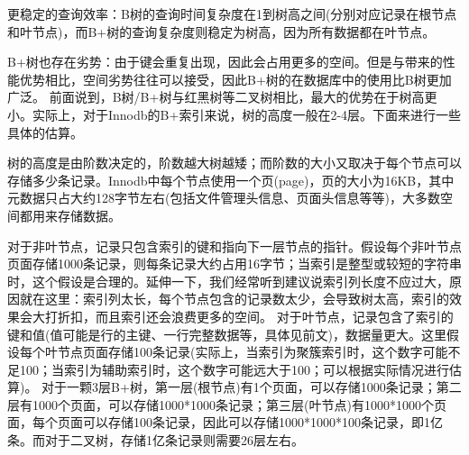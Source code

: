 \documentclass[../../../interview-questions.tex]{subfiles}
\begin{document}
更稳定的查询效率：B树的查询时间复杂度在1到树高之间(分别对应记录在根节点和叶节点)，而B+树的查询复杂度则稳定为树高，因为所有数据都在叶节点。

B+树也存在劣势：由于键会重复出现，因此会占用更多的空间。但是与带来的性能优势相比，空间劣势往往可以接受，因此B+树的在数据库中的使用比B树更加广泛。
前面说到，B树/B+树与红黑树等二叉树相比，最大的优势在于树高更小。实际上，对于Innodb的B+索引来说，树的高度一般在2-4层。下面来进行一些具体的估算。

树的高度是由阶数决定的，阶数越大树越矮；而阶数的大小又取决于每个节点可以存储多少条记录。Innodb中每个节点使用一个页(page)，页的大小为16KB，其中元数据只占大约128字节左右(包括文件管理头信息、页面头信息等等)，大多数空间都用来存储数据。

对于非叶节点，记录只包含索引的键和指向下一层节点的指针。假设每个非叶节点页面存储1000条记录，则每条记录大约占用16字节；当索引是整型或较短的字符串时，这个假设是合理的。延伸一下，我们经常听到建议说索引列长度不应过大，原因就在这里：索引列太长，每个节点包含的记录数太少，会导致树太高，索引的效果会大打折扣，而且索引还会浪费更多的空间。
对于叶节点，记录包含了索引的键和值(值可能是行的主键、一行完整数据等，具体见前文)，数据量更大。这里假设每个叶节点页面存储100条记录(实际上，当索引为聚簇索引时，这个数字可能不足100；当索引为辅助索引时，这个数字可能远大于100；可以根据实际情况进行估算)。
对于一颗3层B+树，第一层(根节点)有1个页面，可以存储1000条记录；第二层有1000个页面，可以存储1000*1000条记录；第三层(叶节点)有1000*1000个页面，每个页面可以存储100条记录，因此可以存储1000*1000*100条记录，即1亿条。而对于二叉树，存储1亿条记录则需要26层左右。
\end{document}
